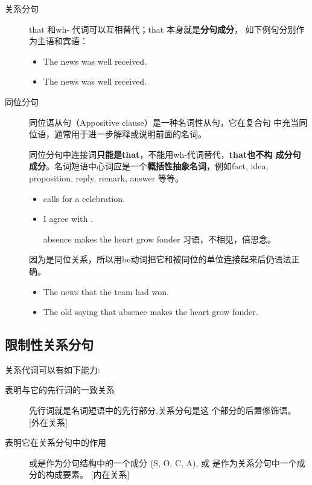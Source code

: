 \begin{description}
\item[关系分句] that 和wh-  代词可以互相替代；that 本身就是\textbf{分句成分}，
  如下例句分别作为主语和宾语：
  \begin{itemize}
  \item The news  was well received.
  \item The news  was well received.
  \end{itemize}

\item[同位分句] 同位语从句（Appositive clause）是一种名词性从句，它在复合句
  中充当同位语，通常用于进一步解释或说明前面的名词。

  同位分句中连接词\textbf{只能是that}，不能用wh-代词替代，\textbf{that也不构
    成分句成分}。名词短语中心词应是一个\textbf{概括性抽象名词}，例如fact,
  idea, proposition, reply, remark, answer 等等。
  \begin{itemize}
  \item {} calls for a celebration.

  \item I agree with .

    absence makes the heart grow fonder 习语，不相见，倍思念。
  \end{itemize}
  因为是同位关系，所以用be动词把它和被同位的单位连接起来后仍语法正确。
  \begin{itemize}
  \item The news  that the team had won.

  \item The old saying  that absence makes the heart grow fonder.
  \end{itemize}
\end{description}

\subsection{限制性关系分句}

关系代词可以有如下能力:
\begin{description}
\item[表明与它的先行词的一致关系] 先行词就是名词短语中的先行部分,关系分句是这
  个部分的后置修饰语。 [外在关系]
\item[表明它在关系分句中的作用] 或是作为分句结构中的一个成分 (S, O, C, A), 或
  是作为关系分句中一个成分的构成要素。 [内在关系]

\end{description}


